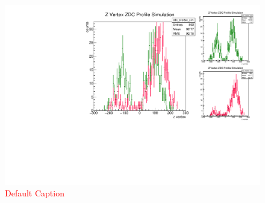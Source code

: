 \begin{figure}
\begin{center}
\includegraphics[width=\linewidth,height=\textheight,keepaspectratio]{./figures/beta_star}
\caption{ \textcolor{red}{Default Caption} }
\label{fig:beta_star}
\end{center}
\end{figure}
